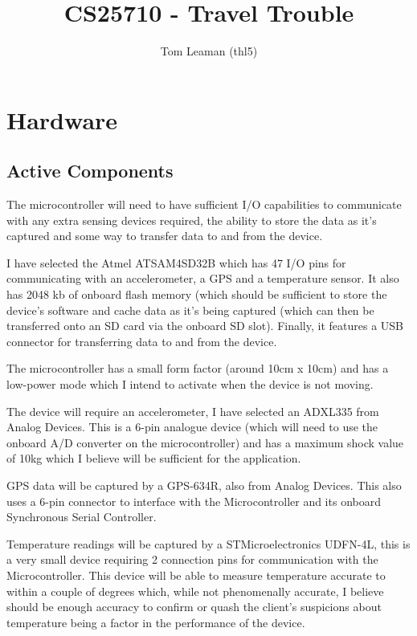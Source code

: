 \documentclass[a4paper, twoside]{article}
\title{CS25710 - Travel Trouble}
\author{Tom Leaman (thl5)}
\begin{document}
\maketitle
\newpage

\section{Hardware}

\subsection{Active Components}

The microcontroller will need to have sufficient I/O capabilities to communicate
with any extra sensing devices required, the ability to store the data as it's
captured and some way to transfer data to and from the device.

I have selected the Atmel ATSAM4SD32B which has 47 I/O pins for communicating
with an accelerometer, a GPS and a temperature sensor. It also has 2048 kb of
onboard flash memory (which should be sufficient to store the device's software
and cache data as it's being captured (which can then be transferred onto an SD
card via the onboard SD slot). Finally, it features a USB connector for
transferring data to and from the device.

The microcontroller has a small form factor (around 10cm x 10cm) and has a
low-power mode which I intend to activate when the device is not moving.

The device will require an accelerometer, I have selected an ADXL335 from Analog
Devices. This is a 6-pin analogue device (which will need to use the onboard A/D
converter on the microcontroller) and has a maximum shock value of 10kg which I
believe will be sufficient for the application.

GPS data will be captured by a GPS-634R, also from Analog Devices. This also
uses a 6-pin connector to interface with the Microcontroller and its onboard
Synchronous Serial Controller.

Temperature readings will be captured by a STMicroelectronics UDFN-4L, this is a
very small device requiring 2 connection pins for communication with the
Microcontroller. This device will be able to measure temperature accurate to
within a couple of degrees which, while not phenomenally accurate, I believe
should be enough accuracy to confirm or quash the client's suspicions about
temperature being a factor in the performance of the device.
\end{document}
